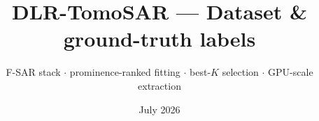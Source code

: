\documentclass[aspectratio=169,9pt]{beamer}
\title{\textbf{DLR-TomoSAR --- Dataset \& ground-truth labels}}
\subtitle{F-SAR stack \; $\cdot$ \; prominence-ranked fitting \; $\cdot$ \; best-$K$ selection \; $\cdot$ \; GPU-scale extraction}
\date{\small July 2026}
\author{}
\begin{document}
\begin{frame}[plain]
  \titlepage
\end{frame}


\end{document}
